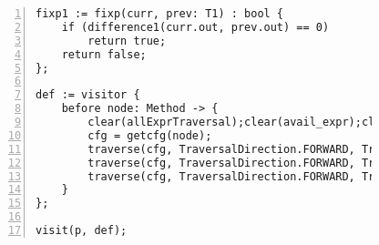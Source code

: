 \begin{figure}[ht!]
\begin{lstlisting}[numbers=left, tabsize=4, escapechar=@, caption={Available expression analysis},label={lst:ae-code},lastline=59]
fixp1 := fixp(curr, prev: T1) : bool {
	if (difference1(curr.out, prev.out) == 0)
		return true;	
	return false;
};

def := visitor {
	before node: Method -> {
		clear(allExprTraversal);clear(avail_expr);clear(killTraversal);clear(allExprset);
		cfg = getcfg(node);
		traverse(cfg, TraversalDirection.FORWARD, TraversalKind.HYBRID, allExprTraversal);
		traverse(cfg, TraversalDirection.FORWARD, TraversalKind.HYBRID, killTraversal);
		traverse(cfg, TraversalDirection.FORWARD, TraversalKind.HYBRID, avail_expr, fixp1);		
	}
};

visit(p, def);
\end{lstlisting}
\end{figure}